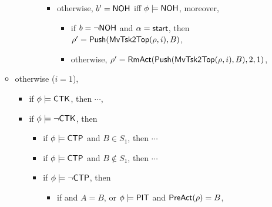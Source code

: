 \begin{itemize}
\begin{itemize}
\begin{itemize}
\begin{itemize}
\begin{itemize}
\begin{itemize}
                                \end{itemize}
                                \item otherwise, $b' = {\sf NOH}$ iff $\phi \models {\sf NOH}$, moreover, 
                                \begin{itemize}
                                    \item if $b = \neg {\sf NOH}$ and $\alpha = {\mathsf{start} }$, then $\rho'=\mathsf{Push}(\mathsf{MvTsk2Top}(\rho, i), B)$,
                                    \item otherwise, $\rho' = \mathsf{RmAct}(\mathsf{Push}(\mathsf{MvTsk2Top}(\rho, i), B), 2, 1)$, 
                                \end{itemize}
                           \end{itemize}
                \end{itemize}
        \end{itemize}
    \item otherwise ($i  = 1$),  
    \begin{itemize}
        \item if $\phi \models {\sf CTK}$, then $\cdots$, 
        \item if $\phi \models \neg {\sf CTK}$, then 
        \begin{itemize}
            \item if $\phi \models {\sf CTP}$ and $B \in S_1$, then $\cdots$
            \item if $\phi \models {\sf CTP}$ and $B\notin S_1$, then $\cdots$
            \item if $\phi \models \neg {\sf CTP}$, then
                \begin{itemize}
                    \item if and $A = B$, or $\phi \models{\sf PIT}$ and $\mathsf{PreAct}(\rho) = B$, 

\end{itemize}
\end{itemize}
\end{itemize}
\end{itemize}
\end{itemize}
